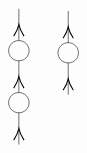 \begin{equation}
\begin{tikzpicture}[x=0.75pt,y=0.75pt,yscale=-1,xscale=1]
\draw    (220.5,57.72) -- (220.5,27.4) ;
\draw [shift={(220.5,42.56)}, rotate = 450] [color={rgb, 255:red, 0; green, 0; blue, 0 }  ][line width=0.75]    (10.93,-4.9) .. controls (6.95,-2.3) and (3.31,-0.67) .. (0,0) .. controls (3.31,0.67) and (6.95,2.3) .. (10.93,4.9)   ;
\draw   (210.75,67.4) .. controls (210.75,62.05) and (215.12,57.72) .. (220.5,57.72) .. controls (225.88,57.72) and (230.25,62.05) .. (230.25,67.4) .. controls (230.25,72.75) and (225.88,77.08) .. (220.5,77.08) .. controls (215.12,77.08) and (210.75,72.75) .. (210.75,67.4) -- cycle ;
\draw    (220.5,107.4) -- (220.5,77.08) ;
\draw [shift={(220.5,92.24)}, rotate = 450] [color={rgb, 255:red, 0; green, 0; blue, 0 }  ][line width=0.75]    (10.93,-4.9) .. controls (6.95,-2.3) and (3.31,-0.67) .. (0,0) .. controls (3.31,0.67) and (6.95,2.3) .. (10.93,4.9)   ;

\draw   (210.75,117.08) .. controls (210.75,111.74) and (215.12,107.4) .. (220.5,107.4) .. controls (225.88,107.4) and (230.25,111.74) .. (230.25,117.08) .. controls (230.25,122.43) and (225.88,126.77) .. (220.5,126.77) .. controls (215.12,126.77) and (210.75,122.43) .. (210.75,117.08) -- cycle ;
\draw    (220.5,157.08) -- (220.5,126.77) ;
\draw [shift={(220.5,141.93)}, rotate = 450] [color={rgb, 255:red, 0; green, 0; blue, 0 }  ][line width=0.75]    (10.93,-4.9) .. controls (6.95,-2.3) and (3.31,-0.67) .. (0,0) .. controls (3.31,0.67) and (6.95,2.3) .. (10.93,4.9)   ;
\draw    (267.5,59.72) -- (267.5,29.4) ;
\draw [shift={(267.5,44.56)}, rotate = 450] [color={rgb, 255:red, 0; green, 0; blue, 0 }  ][line width=0.75]    (10.93,-4.9) .. controls (6.95,-2.3) and (3.31,-0.67) .. (0,0) .. controls (3.31,0.67) and (6.95,2.3) .. (10.93,4.9)   ;
\draw   (257.75,69.4) .. controls (257.75,64.05) and (262.12,59.72) .. (267.5,59.72) .. controls (272.88,59.72) and (277.25,64.05) .. (277.25,69.4) .. controls (277.25,74.75) and (272.88,79.08) .. (267.5,79.08) .. controls (262.12,79.08) and (257.75,74.75) .. (257.75,69.4) -- cycle ;
\draw    (267.5,109.4) -- (267.5,79.08) ;
\draw [shift={(267.5,94.24)}, rotate = 450] [color={rgb, 255:red, 0; green, 0; blue, 0 }  ][line width=0.75]    (10.93,-4.9) .. controls (6.95,-2.3) and (3.31,-0.67) .. (0,0) .. controls (3.31,0.67) and (6.95,2.3) .. (10.93,4.9)   ;


\end{tikzpicture}
\end{equation}

